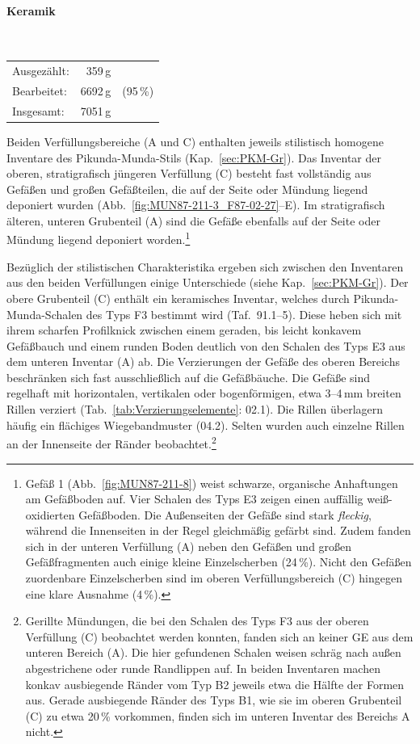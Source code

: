 \newpage\paragraph{Keramik\vspace{.5em}}\mbox{}\\
\begin{tabular}{@{}lrl@{}}
Ausgezählt: & 359\,g & \\ 
Bearbeitet: & 6692\,g & (95\,\%) \\ 
Insgesamt: & 7051\,g & \\ 
\end{tabular} 

\vspace{1em}
\noindent Beiden Verfüllungsbereiche (A und C) enthalten jeweils stilistisch homogene Inventare des Pikunda-Munda-Stils (Kap.~\ref{sec:PKM-Gr}). Das Inventar der oberen, stratigrafisch jüngeren Verfüllung (C) besteht fast vollständig aus Gefäßen und großen Gefäßteilen, die auf der Seite oder Mündung liegend deponiert wurden (Abb.~\ref{fig:MUN87-211-3_F87-02-27}--E). Im stratigrafisch älteren, unteren Grubenteil (A) sind die Gefäße ebenfalls auf der Seite oder Mündung liegend deponiert worden.\footnote{Gefäß 1 (Abb.~\ref{fig:MUN87-211-8}) weist schwarze, organische  Anhaftungen am Gefäßboden auf. Vier Schalen des Typs E3 zeigen einen auffällig weiß-oxidierten Gefäßboden. Die Außenseiten der Gefäße sind stark \textit{fleckig}, während die Innenseiten in der Regel gleichmäßig gefärbt sind. Zudem fanden sich in der unteren Verfüllung (A) neben den Gefäßen und großen Gefäßfragmenten auch einige kleine Einzelscherben (24\,\%). Nicht den Gefäßen zuordenbare Einzelscherben sind im oberen Verfüllungsbereich (C) hingegen eine klare Ausnahme (4\,\%).}

Bezüglich der stilistischen Charakteristika ergeben sich zwischen den Inventaren aus den beiden Verfüllungen einige Unterschiede (siehe Kap.~\ref{sec:PKM-Gr}). Der obere Grubenteil (C) enthält ein keramisches Inventar, welches durch Pikunda-Munda-Schalen des Typs F3 bestimmt wird (Taf.~91.1--5). Diese heben sich mit ihrem scharfen Profilknick zwischen einem geraden, bis leicht konkavem Gefäßbauch und einem runden Boden deutlich von den Schalen des Typs E3 aus dem unteren Inventar (A) ab. Die Verzierungen der Gefäße des oberen Bereichs beschränken sich fast ausschließlich auf die Gefäßbäuche. Die Gefäße sind regelhaft mit horizontalen, vertikalen oder bogenförmigen, etwa 3--4\,mm breiten Rillen verziert (Tab.~\ref{tab:Verzierungselemente}: 02.1). Die Rillen überlagern häufig ein flächiges Wiegebandmuster (04.2). Selten wurden auch einzelne Rillen an der Innenseite der Ränder beobachtet.\footnote{Gerillte Mündungen, die bei den Schalen des Typs F3 aus der oberen Verfüllung (C) beobachtet werden konnten, fanden sich an keiner GE aus dem unteren Bereich (A). Die hier gefundenen Schalen weisen schräg nach außen abgestrichene oder runde Randlippen auf. In beiden Inventaren machen konkav ausbiegende Ränder vom Typ B2 jeweils etwa die Hälfte der Formen aus. Gerade ausbiegende Ränder des Typs B1, wie sie im oberen Grubenteil (C) zu etwa 20\,\% vorkommen, finden sich im unteren Inventar des Bereichs A nicht.}

